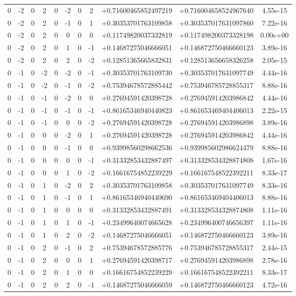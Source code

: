 \begin{table}[ht]
{\begin{tabular}{c|c|c|c|c|c|c|c|c|c|c}
0 & -2 & 0 & 2 & 0 & -2 & 0 & 2 &  +0.71600465852497219 & +0.716004658524967640 &   4.55e-15   \\
0 & -2 & 0 & 2 & 0 & -1 & 0 & 1 &  +0.30353701763109858 & +0.303537017631097860 &   7.22e-16   \\
0 & -2 & 0 & 2 & 0 & 0 & 0 & 0 &  +0.11749820037332819 & +0.117498200373328198 &   0.00e+00   \\
0 & -2 & 0 & 2 & 0 & 1 & 0 & -1 &  +0.14687275046666051 & +0.146872750466660123 &   3.89e-16   \\
0 & -2 & 0 & 2 & 0 & 2 & 0 & -2 &  +0.12851365665832831 & +0.128513656658326258 &   2.05e-15   \\
0 & -1 & 0 & -2 & 0 & -2 & 0 & -1 &  +0.30353701763109730 & +0.303537017631097749 &   4.44e-16   \\
0 & -1 & 0 & -2 & 0 & -1 & 0 & -2 &  +0.75394678572885442 & +0.753946785728855317 &   8.88e-16   \\
0 & -1 & 0 & -1 & 0 & -2 & 0 & 0 &  +0.27694591420398728 & +0.276945914203986842 &   4.44e-16   \\
0 & -1 & 0 & -1 & 0 & -1 & 0 & -1 &  +0.86165346940440823 & +0.861653469404406013 &   2.22e-15   \\
0 & -1 & 0 & -1 & 0 & 0 & 0 & -2 &  +0.27694591420398728 & +0.276945914203986898 &   3.89e-16   \\
0 & -1 & 0 & 0 & 0 & -2 & 0 & 1 &  +0.27694591420398728 & +0.276945914203986842 &   4.44e-16   \\
0 & -1 & 0 & 0 & 0 & -1 & 0 & 0 &  +0.93998560298662536 & +0.939985602986624479 &   8.88e-16   \\
0 & -1 & 0 & 0 & 0 & 0 & 0 & -1 &  +0.31332853432887497 & +0.313328534328874808 &   1.67e-16   \\
0 & -1 & 0 & 0 & 0 & 1 & 0 & -2 &  +0.16616754852239229 & +0.166167548522392211 &   8.33e-17   \\
0 & -1 & 0 & 1 & 0 & -2 & 0 & 2 &  +0.30353701763109858 & +0.303537017631097749 &   8.33e-16   \\
0 & -1 & 0 & 1 & 0 & -1 & 0 & 1 &  +0.86165346940440690 & +0.861653469404406013 &   8.88e-16   \\
0 & -1 & 0 & 1 & 0 & 0 & 0 & 0 &  +0.31332853432887491 & +0.313328534328874808 &   1.11e-16   \\
0 & -1 & 0 & 1 & 0 & 1 & 0 & -1 &  +0.23499640074665628 & +0.234996400746656397 &   1.11e-16   \\
0 & -1 & 0 & 1 & 0 & 2 & 0 & -2 &  +0.14687275046666051 & +0.146872750466660123 &   3.89e-16   \\
0 & -1 & 0 & 2 & 0 & -1 & 0 & 2 &  +0.75394678572885776 & +0.753946785728855317 &   2.44e-15   \\
0 & -1 & 0 & 2 & 0 & 0 & 0 & 1 &  +0.27694591420398717 & +0.276945914203986898 &   2.78e-16   \\
0 & -1 & 0 & 2 & 0 & 1 & 0 & 0 &  +0.16616754852239229 & +0.166167548522392211 &   8.33e-17   \\
0 & -1 & 0 & 2 & 0 & 2 & 0 & -1 &  +0.14687275046666059 & +0.146872750466660123 &   4.72e-16   \\


\end{tabular}}
\end{table}
